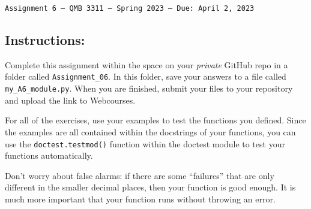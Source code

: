 \documentclass[11pt]{exam}
\begin{document}
\texttt{Assignment 6 --- QMB 3311 ---  Spring 2023  --- Due: April 2, 2023}

\subsection*{Instructions:}

Complete this assignment within the space on your \textit{private} GitHub repo in a folder called \texttt{Assignment\_06}. In this folder, save your answers to a file called \texttt{my\_A6\_module.py}. When you are finished, submit your files to your repository and upload the link to Webcourses.

For all of the exercises, use your examples to test the functions you defined. Since the examples are all contained within the docstrings of your functions, you can use the
\texttt{doctest.testmod()} function within the doctest module to test your functions automatically.

Don't worry about false alarms: if there are some ``failures'' that are only different in the smaller decimal places, then your function is good enough. It is much more important that your function runs without throwing an error.
\end{document}
